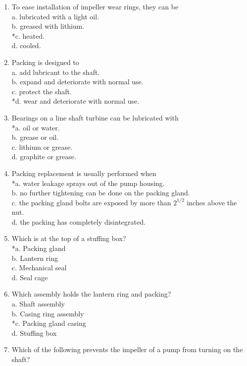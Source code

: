 \begin{enumerate}[1.]
\item To ease installation of impeller wear rings, they can be\\
a. lubricated with a light oil.\\
b. greased with lithium.\\
*c. heated.\\
d. cooled.\\
\item Packing is designed to\\
a. add lubricant to the shaft.\\
b. expand and deteriorate with normal use.\\
c. protect the shaft.\\
*d. wear and deteriorate with normal use.\\
\item Bearings on a line shaft turbine can be lubricated with\\
*a. oil or water.\\
b. grease or oil.\\
c. lithium or grease.\\
d. graphite or grease.\\
\item Packing replacement is usually performed when\\
*a. water leakage sprays out of the pump housing.\\
b. no further tightening can be done on the packing gland.\\
c. the packing gland bolts are exposed by more than $2^{1 / 2}$ inches above the nut.\\
d. the packing has completely disintegrated.\\
\item Which is at the top of a stuffing box?\\
*a. Packing gland\\
b. Lantern ring\\
c. Mechanical seal\\
d. Seal cage\\
\item Which assembly holds the lantern ring and packing?\\
a. Shaft assembly\\
b. Casing ring assembly\\
*c. Packing gland casing\\
d. Stuffing box\\
\item Which of the following prevents the impeller of a pump from turning on the shaft?\\

\end{enumerate}
